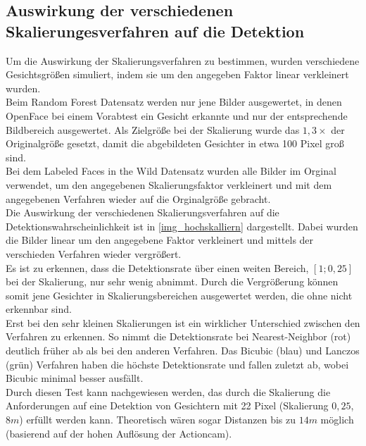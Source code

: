 \subsection{Auswirkung der verschiedenen Skalierungesverfahren auf die Detektion}
\label{OpenFace_skal}
Um die Auswirkung der Skalierungsverfahren zu bestimmen, wurden verschiedene Gesichtsgrößen simuliert, indem sie um den angegeben Faktor linear verkleinert wurden.\\
Beim Random Forest Datensatz \cite{database_Face_Ori} werden nur jene Bilder ausgewertet, in denen OpenFace bei einem Vorabtest ein Gesicht erkannte und nur der entsprechende Bildbereich ausgewertet. Als Zielgröße bei der Skalierung wurde das $1,3\times$ der Originalgröße gesetzt, damit die abgebildeten Gesichter in etwa 100 Pixel groß sind.\\
Bei dem Labeled Faces in the Wild \cite{database_Face} Datensatz wurden alle Bilder im Orginal verwendet, um den angegebenen Skalierungsfaktor verkleinert und mit dem angegebenen Verfahren wieder auf die Orginalgröße gebracht.\\
Die Auswirkung der verschiedenen Skalierungsverfahren auf die Detektionswahrscheinlichkeit ist in \autoref{img_hochskalliern} dargestellt. Dabei wurden die Bilder linear um den angegebene Faktor verkleinert und mittels der verschieden Verfahren wieder vergrößert.\\
Es ist zu erkennen, dass die Detektionsrate über einen weiten Bereich, $[1;0,25]$ bei der Skalierung, nur sehr wenig abnimmt. Durch die Vergrößerung können somit jene Gesichter in Skalierungsbereichen ausgewertet werden, die ohne nicht erkennbar sind.\\
Erst bei den sehr kleinen Skalierungen ist ein wirklicher Unterschied zwischen den Verfahren zu erkennen. So nimmt die Detektionsrate bei  Nearest-Neighbor (rot) deutlich früher ab als bei den anderen Verfahren. Das Bicubic (blau) und Lanczos (grün) Verfahren haben die höchste Detektionsrate und fallen zuletzt ab, wobei Bicubic minimal besser ausfällt.\\
Durch diesen Test kann nachgewiesen werden, das durch die Skalierung die Anforderungen auf eine Detektion von Gesichtern mit 22 Pixel (Skalierung $0,25$, $8m$) erfüllt werden kann. Theoretisch wären sogar Distanzen bis zu $14m$ möglich (basierend auf der hohen Auflösung der Actioncam).
